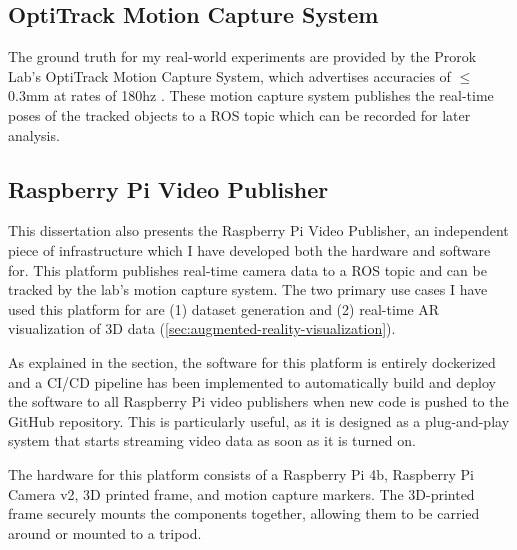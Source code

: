 \subsection{OptiTrack Motion Capture System}
\label{sec:optitrack-motion-capture-system}
The ground truth for my real-world experiments are provided by the Prorok Lab's OptiTrack Motion Capture System, which advertises accuracies of $\leq$0.3mm at rates of 180hz \autocite{OptiTrackForRobotics}. These motion capture system publishes the real-time poses of the tracked objects to a ROS topic which can be recorded for later analysis.

\subsection{Raspberry Pi Video Publisher}
\label{sec:raspberry-pi-video-publisher}
This dissertation also presents the Raspberry Pi Video Publisher, an independent piece of infrastructure which I have developed both the hardware and software for. This platform publishes real-time camera data to a ROS topic and can be tracked by the lab's motion capture system. The two primary use cases I have used this platform for are (1) dataset generation and (2) real-time AR visualization of 3D data (\autoref{sec:augmented-reality-visualization}).

As explained in the  section, the software for this platform is entirely dockerized and a CI/CD pipeline has been implemented to automatically build and deploy the software to all Raspberry Pi video publishers when new code is pushed to the GitHub repository. This is particularly useful, as it is designed as a plug-and-play system that starts streaming video data as soon as it is turned on.

The hardware for this platform consists of a Raspberry Pi 4b, Raspberry Pi Camera v2, 3D printed frame, and motion capture markers. The 3D-printed frame securely mounts the components together, allowing them to be carried around or mounted to a tripod.

